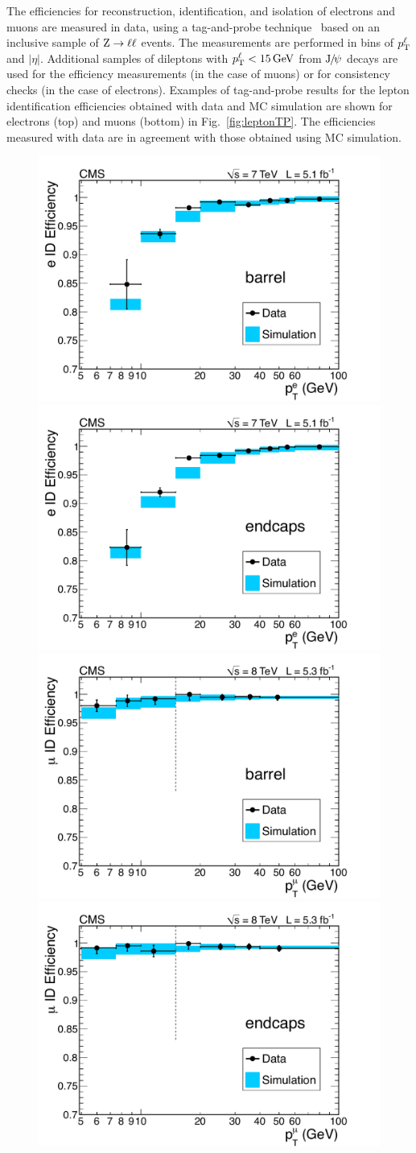 \documentclass[12pt,twoside,a4paper,cmspaper,final,collab]{cms-tdr}
\begin{document}
The efficiencies for reconstruction, identification, and isolation of electrons and muons
are measured in data, using a tag-and-probe technique~\cite{CMS:2011aa} based
on an inclusive sample of $\mathrm{Z} \to \ell\ell $ events.
The measurements are performed in bins of $p_{\mathrm{T}}^{\ell} $ and $ |\eta| $.
Additional samples of dileptons with $p_{\mathrm{T}}^{\ell} < 15\,\text{Ge\hspace{-.08em}V}$ from $\mathrm{J}\hspace{-.08em}/\hspace{-.14em}\psi$ decays are used
for the efficiency measurements (in the case of muons)
or for consistency checks (in the case of electrons).
Examples of tag-and-probe results for the lepton identification efficiencies
obtained with data and MC simulation
are shown for electrons (top) and muons (bottom) in Fig.~\ref{fig:leptonTP}.
The efficiencies measured with
data are in agreement with those obtained using MC simulation.
\begin{figure}[htbp]
   \begin{center}
     \includegraphics[width=0.49\linewidth]{figures/HZZ_Eff_ElectronBarrel.pdf}
     \includegraphics[width=0.49\linewidth]{figures/HZZ_Eff_ElectronEndcap.pdf}
     \includegraphics[width=0.49\linewidth]{figures/HZZ_Eff_MuonBarrel.pdf}
     \includegraphics[width=0.49\linewidth]{figures/HZZ_Eff_MuonEndcap.pdf}

\end{center}
\end{figure}
\end{document}
